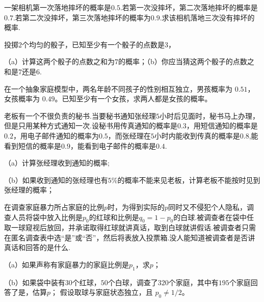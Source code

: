 \begin{exercise}[连续受损的生存概率]\label{q:Y2.12}
一架相机第一次落地摔坏的概率是$0.5$.若第一次没摔坏，第二次落地摔坏的概率是$0.7$.若第二次没摔坏，第三次落地摔坏的概率为$0.9$.求该相机落地三次没有摔坏的概率.\par{}\end{exercise}

\begin{exercise}[已知一枚骰子的点数]\label{q:Y2.13}
投掷$2$个均匀的骰子，已知至少有一个骰子的点数是$3$，

（a）计算这两个骰子的点数之和为$7$的概率；（b）你应当猜这两个骰子的点数之和是$7$还是$6$.\par{}\end{exercise}

\begin{exercise}[两孩家庭中的条件事件]\label{q:Y2.15}
在一个抽象家庭模型中，两名年龄不同孩子的性别相互独立，男孩概率为 $0.51$，女孩概率为 $0.49$。已知至少有一个女孩，求两人都是女孩的概率。\par{}\end{exercise}

\begin{exercise}[通知渠道的全概率]\label{q:Y2.16}
老板有一个不很负责的秘书.当要秘书通知张经理$5$小时后见面时，秘书马上办理，但是只用某种方式通知一次.设秘书用传真通知的概率是$0.3$，用短信通知的概率是$0.2$，用电子邮件通知的概率为$0.5$，而张经理在$5$小时内能收到传真的概率是$0.8$,能看到短信的概率是$0.9$，能看到电子邮件的概率是$0.4$.

（a）计算张经理收到通知的概率;

（b）如果收到通知的张经理也有$5$\%的概率不能来见老板，计算老板不能按时见到张经理的概率；\par{}\end{exercise}

\begin{exercise}[隐私调查的随机化回答]\label{q:Y2.17}
在调查家庭暴力所占家庭的比例$p$时，为得到实际的$p$同时又不侵犯个人隐私，调查人员将袋中放入比例是$p_0$的红球和比例是$q_0=1-p_0$的白球.被调查者在袋中任取一球窥视后放回，并承诺取得红球就讲真话，取到白球就讲假话.被调查者只需在匿名调查表中选“是”或“否”，然后将表放入投票箱.没人能知道被调查者是否讲真话和回答的是什么.

（a）如果声称有家庭暴力的家庭比例是$p_1$，求$p$；

（b）如果袋中装有$30$个红球，$50$个白球，调查了$320$个家庭，其中有$195$个家庭回答了是，估算$p$； 假设取球与家庭状态独立，且 $p_0\ne1/2$。\par{}\end{exercise}

